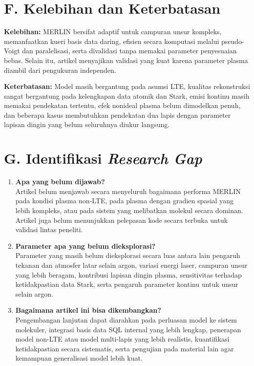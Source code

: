 \documentclass[12pt,a4paper]{article}
\newcommand{\templateitem}[2]{\textbf{#1} #2\par}
\begin{document}
\section*{F. Kelebihan dan Keterbatasan}
\templateitem{Kelebihan:}{MERLIN bersifat adaptif untuk campuran unsur kompleks, memanfaatkan kueri basis data daring, efisien secara komputasi melalui pseudo-Voigt dan paralelisasi, serta divalidasi tanpa memakai parameter penyesuaian bebas. Selain itu, artikel menyajikan validasi yang kuat karena parameter plasma diambil dari pengukuran independen.}

\templateitem{Keterbatasan:}{Model masih bergantung pada asumsi LTE, kualitas rekonstruksi sangat bergantung pada kelengkapan data atomik dan Stark, emisi kontinu masih memakai pendekatan tertentu, efek nonideal plasma belum dimodelkan penuh, dan beberapa kasus membutuhkan pendekatan dua lapis dengan parameter lapisan dingin yang belum seluruhnya diukur langsung.}

\section*{G. Identifikasi \textit{Research Gap}}
\begin{enumerate}
  \item \textbf{Apa yang belum dijawab?}\\
  Artikel belum menjawab secara menyeluruh bagaimana performa MERLIN pada kondisi plasma non-LTE, pada plasma dengan gradien spasial yang lebih kompleks, atau pada sistem yang melibatkan molekul secara dominan. Artikel juga belum menunjukkan pelepasan kode secara terbuka untuk validasi lintas peneliti.

  \item \textbf{Parameter apa yang belum dieksplorasi?}\\
  Parameter yang masih belum dieksplorasi secara luas antara lain pengaruh tekanan dan atmosfer latar selain argon, variasi energi laser, campuran unsur yang lebih beragam, kontribusi lapisan dingin plasma, sensitivitas terhadap ketidakpastian data Stark, serta pengaruh parameter kontinu untuk unsur selain argon.

  \item \textbf{Bagaimana artikel ini bisa dikembangkan?}\\
  Pengembangan lanjutan dapat diarahkan pada perluasan model ke sistem molekuler, integrasi basis data SQL internal yang lebih lengkap, penerapan model non-LTE atau model multi-lapis yang lebih realistis, kuantifikasi ketidakpastian secara sistematis, serta pengujian pada material lain agar kemampuan generalisasi model lebih kuat.
\end{enumerate}
\end{document}
